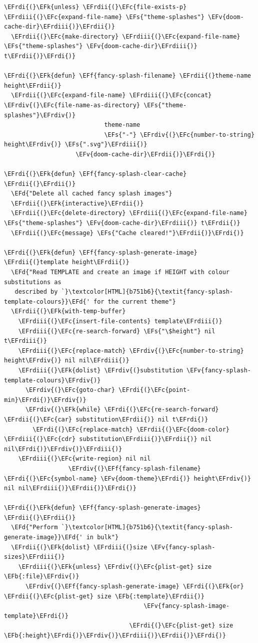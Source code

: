 \documentclass{scrartcl}
\newcommand{\EFk}[1]{\textcolor{EFk}{#1}} %
\newcommand{\EFd}[1]{\textcolor{EFd}{\textit{#1}}} %
\newcommand{\EFs}[1]{\textcolor{EFs}{#1}} %
\newcommand{\EFb}[1]{\textcolor{EFb}{#1}} %
\newcommand{\EFc}[1]{\textcolor{EFc}{#1}} %
\newcommand{\EFv}[1]{\textcolor{EFv}{#1}} %
\newcommand{\EFf}[1]{\textcolor{EFf}{#1}} %
\newcommand{\EFrdi}[1]{\textcolor{EFrdi}{#1}} %
\newcommand{\EFrdii}[1]{\textcolor{EFrdii}{#1}} %
\newcommand{\EFrdiii}[1]{\textcolor{EFrdiii}{#1}} %
\newcommand{\EFrdiv}[1]{\textcolor{EFrdiv}{#1}} %
\begin{document}
\begin{Code}
\begin{Verbatim}[]
\EFrdi{(}\EFk{unless} \EFrdii{(}\EFc{file-exists-p} \EFrdiii{(}\EFc{expand-file-name} \EFs{"theme-splashes"} \EFv{doom-cache-dir}\EFrdiii{)}\EFrdii{)}
  \EFrdii{(}\EFc{make-directory} \EFrdiii{(}\EFc{expand-file-name} \EFs{"theme-splashes"} \EFv{doom-cache-dir}\EFrdiii{)} t\EFrdii{)}\EFrdi{)}

\EFrdi{(}\EFk{defun} \EFf{fancy-splash-filename} \EFrdii{(}theme-name height\EFrdii{)}
  \EFrdii{(}\EFc{expand-file-name} \EFrdiii{(}\EFc{concat} \EFrdiv{(}\EFc{file-name-as-directory} \EFs{"theme-splashes"}\EFrdiv{)}
                            theme-name
                            \EFs{"-"} \EFrdiv{(}\EFc{number-to-string} height\EFrdiv{)} \EFs{".svg"}\EFrdiii{)}
                    \EFv{doom-cache-dir}\EFrdii{)}\EFrdi{)}

\EFrdi{(}\EFk{defun} \EFf{fancy-splash-clear-cache} \EFrdii{(}\EFrdii{)}
  \EFd{"Delete all cached fancy splash images"}
  \EFrdii{(}\EFk{interactive}\EFrdii{)}
  \EFrdii{(}\EFc{delete-directory} \EFrdiii{(}\EFc{expand-file-name} \EFs{"theme-splashes"} \EFv{doom-cache-dir}\EFrdiii{)} t\EFrdii{)}
  \EFrdii{(}\EFc{message} \EFs{"Cache cleared!"}\EFrdii{)}\EFrdi{)}

\EFrdi{(}\EFk{defun} \EFf{fancy-splash-generate-image} \EFrdii{(}template height\EFrdii{)}
  \EFd{"Read TEMPLATE and create an image if HEIGHT with colour substitutions as
   described by `}\textcolor[HTML]{b751b6}{\textit{fancy-splash-template-colours}}\EFd{' for the current theme"}
  \EFrdii{(}\EFk{with-temp-buffer}
    \EFrdiii{(}\EFc{insert-file-contents} template\EFrdiii{)}
    \EFrdiii{(}\EFc{re-search-forward} \EFs{"\$height"} nil t\EFrdiii{)}
    \EFrdiii{(}\EFc{replace-match} \EFrdiv{(}\EFc{number-to-string} height\EFrdiv{)} nil nil\EFrdiii{)}
    \EFrdiii{(}\EFk{dolist} \EFrdiv{(}substitution \EFv{fancy-splash-template-colours}\EFrdiv{)}
      \EFrdiv{(}\EFc{goto-char} \EFrdi{(}\EFc{point-min}\EFrdi{)}\EFrdiv{)}
      \EFrdiv{(}\EFk{while} \EFrdi{(}\EFc{re-search-forward} \EFrdii{(}\EFc{car} substitution\EFrdii{)} nil t\EFrdi{)}
        \EFrdi{(}\EFc{replace-match} \EFrdii{(}\EFc{doom-color} \EFrdiii{(}\EFc{cdr} substitution\EFrdiii{)}\EFrdii{)} nil nil\EFrdi{)}\EFrdiv{)}\EFrdiii{)}
    \EFrdiii{(}\EFc{write-region} nil nil
                  \EFrdiv{(}\EFf{fancy-splash-filename} \EFrdi{(}\EFc{symbol-name} \EFv{doom-theme}\EFrdi{)} height\EFrdiv{)} nil nil\EFrdiii{)}\EFrdii{)}\EFrdi{)}

\EFrdi{(}\EFk{defun} \EFf{fancy-splash-generate-images} \EFrdii{(}\EFrdii{)}
  \EFd{"Perform `}\textcolor[HTML]{b751b6}{\textit{fancy-splash-generate-image}}\EFd{' in bulk"}
  \EFrdii{(}\EFk{dolist} \EFrdiii{(}size \EFv{fancy-splash-sizes}\EFrdiii{)}
    \EFrdiii{(}\EFk{unless} \EFrdiv{(}\EFc{plist-get} size \EFb{:file}\EFrdiv{)}
      \EFrdiv{(}\EFf{fancy-splash-generate-image} \EFrdi{(}\EFk{or} \EFrdii{(}\EFc{plist-get} size \EFb{:template}\EFrdii{)}
                                       \EFv{fancy-splash-image-template}\EFrdi{)}
                                   \EFrdi{(}\EFc{plist-get} size \EFb{:height}\EFrdi{)}\EFrdiv{)}\EFrdiii{)}\EFrdii{)}\EFrdi{)}


\end{Verbatim}
\end{Code}
\end{document}
